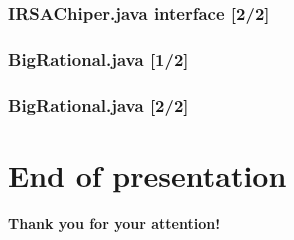 \documentclass{beamer}
\begin{document}
  \begin{frame}
  \frametitle{IRSAChiper.java interface [2/2]}
    
  \end{frame}
  
  \begin{frame}
  \frametitle{BigRational.java [1/2]}
    
    \lstset{basicstyle=\tiny}
    
    
  \end{frame}
  
    \begin{frame}
  \frametitle{BigRational.java [2/2]}
    
  \end{frame}
  
  \section*{End of presentation}
  
    \begin{frame}
    \begin{center}
           \textbf{Thank you for your attention!}
    \end{center}
  \end{frame}
\end{document}
